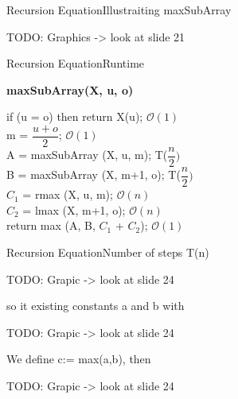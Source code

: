 
\begin{frame}{Recursion Equation}{Illustraiting maxSubArray}
  
  TODO: Graphics -> look at slide 21 \vspace{2em}
  
\end{frame}


\begin{frame}{Recursion Equation}{Runtime}
  
  \textbf{maxSubArray(X, u, o)} \vspace{2em}
  
  if (u = o) then return X(u);\hspace{4em} $\mathcal{O}(1)$\\\vspace{0.5em}
  m = $\dfrac{u+o}{2}$;\hspace{10.7em} $\mathcal{O}(1)$\\\vspace{0.5em}
  A = maxSubArray (X, u, m);\hspace{3.1em} T($\dfrac{n}{2})$\\\vspace{0.5em}
  B = maxSubArray (X, m+1, o);\hspace{1.9em} T($\dfrac{n}{2})$\\\vspace{0.5em}
  $C_1$ = rmax (X, u, m);\hspace{6.2em} $\mathcal{O}(n)$\\\vspace{0.5em}
  $C_2$ = lmax (X, m+1, o);\hspace{5.2em} $\mathcal{O}(n)$\\\vspace{0.5em}
  return max (A, B, $C_1$ + $C_2$);\hspace{3.3em} $\mathcal{O}(1)$
\end{frame}


\begin{frame}{Recursion Equation}{Number of steps T(n)}
  
  TODO: Grapic -> look at slide 24 \vspace{2em}
  
  so it existing constants a and b with\\\vspace{2em}
  
  TODO: Grapic -> look at slide 24 \vspace{2em}
  
  We define c:= max(a,b), then\\\vspace{2em}
  
  TODO: Grapic -> look at slide 24
  
\end{frame}

